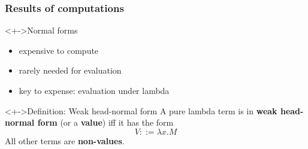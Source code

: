 \documentclass[pdftex,aspectratio=169]{beamer}
\subtitle
{Evaluation and Typing}
\begin{document}
\begin{frame}
  \titlepage
\end{frame}



\begin{frame}[fragile]
  \frametitle{Results of computations}
\begin{block}<+->{Normal forms}
  \begin{itemize}
  \item expensive to compute
  \item rarely needed for evaluation
  \item key to expense: evaluation under lambda
  \end{itemize}
\end{block}
\begin{block}<+->{Definition: Weak head-normal form}
  A pure lambda term is in \textbf{weak head-normal form} (or a \textbf{value}) iff it
  has the form  
  \begin{displaymath}
    V ::= \lambda x.M
  \end{displaymath}
  All other terms are \textbf{non-values}.
\end{block}
\end{frame}             
\end{document}
